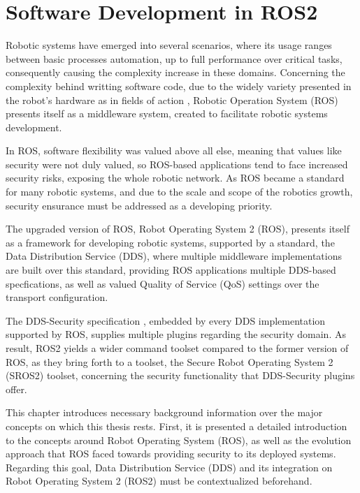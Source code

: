 \chapter{Software Development in ROS2}\label{c:ros}

Robotic systems have emerged into several scenarios, where its usage ranges between basic processes automation, up to full performance over critical tasks, consequently causing the complexity increase in these domains. Concerning the complexity behind writting software code, due to the widely variety presented in the robot's hardware as in fields of action \cite{cousins2011exponential}, Robotic Operation System (ROS) presents itself as a middleware system, created to facilitate robotic systems development.

In ROS, software flexibility was valued above all else, meaning that values like security were not duly valued, so ROS-based applications tend to face increased security risks, exposing the whole robotic network. As ROS became a standard for many robotic systems, and due to the scale and scope of the robotics growth, security ensurance must be addressed as a developing priority. \cite{diluoffo2018robot, kim2018security}

The upgraded version of ROS, Robot Operating System 2 (ROS), presents itself as a framework for developing robotic systems, supported by a standard, the Data Distribution Service (DDS), where multiple middleware implementations are built over this standard, providing ROS applications multiple DDS-based specfications, as well as valued Quality of Service (QoS) settings over the transport configuration. 

The DDS-Security specification \cite{dds-s}, embedded by every DDS implementation supported by ROS, supplies multiple plugins regarding the security domain. As result, ROS2 yields a wider command toolset compared to the former version of ROS, as they bring forth to a toolset, the Secure Robot Operating System 2 (SROS2) toolset, concerning the security functionality that DDS-Security plugins offer.

This chapter introduces necessary background information over the major concepts on which this thesis rests. First, it is presented a detailed introduction to the concepts around Robot Operating System (ROS), as well as the evolution approach that ROS faced towards providing security to its deployed systems. Regarding this goal, Data Distribution Service (DDS) and its integration on Robot Operating System 2 (ROS2) must be contextualized beforehand.


